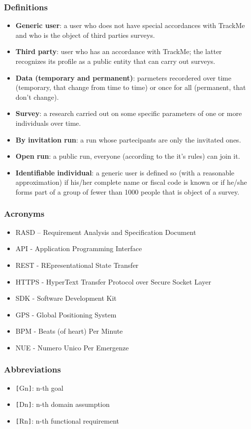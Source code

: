 \subsubsection{Definitions}
\begin{itemize}
\item \textbf{Generic user}: a user who does not have special accordances with TrackMe and who is the object of third parties surveys.
\item \textbf{Third party}: user who has an accordance with TrackMe; the latter recognizes its profile as a public entity that can carry out surveys.
\item \textbf{Data (temporary and permanent)}: parmeters recordered over time (temporary, that change from time to time) or once for all (permanent, that don't change).
\item \textbf{Survey}: a research carried out on some specific parameters of one or more individuals over time.
\item \textbf{By invitation run}: a run whose partecipants are only the invitated ones.
\item \textbf{Open run}: a public run, everyone (according to the it's rules) can join it.
\item \textbf{Identifiable individual}: a generic user is defined so (with a reasonable approximation) if his/her complete name or fiscal code is known or if he/she forms part of a group of fewer than 1000 people that is object of a survey.
\end{itemize}
\subsubsection{Acronyms}
\begin{itemize}
\item RASD – Requirement Analysis and Specification Document
\item API - Application Programming Interface
\item REST - REpresentational State Transfer
\item HTTPS - HyperText Transfer Protocol over Secure Socket Layer
\item SDK - Software Development Kit
\item GPS - Global Positioning System
\item BPM - Beats (of heart) Per Minute
\item NUE - Numero Unico Per Emergenze
\end{itemize}
\subsubsection{Abbreviations}
\begin{itemize}
\item \verb|[|Gn\verb|]|: n-th goal
\item \verb|[|Dn\verb|]|: n-th domain assumption
\item \verb|[|Rn\verb|]|: n-th functional requirement
\end{itemize}

